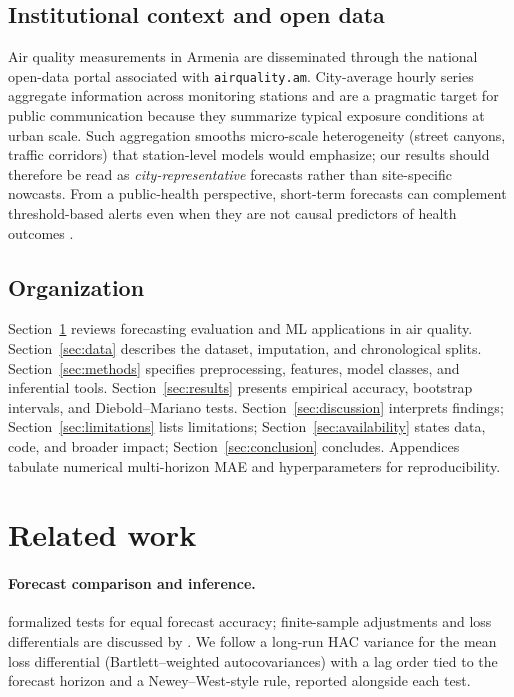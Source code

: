 \documentclass[11pt,a4paper]{article}
\begin{document}
\subsection{Institutional context and open data}

Air quality measurements in Armenia are disseminated through the national open-data portal associated with \texttt{airquality.am}. City-average hourly series aggregate information across monitoring stations and are a pragmatic target for public communication because they summarize typical exposure conditions at urban scale. Such aggregation smooths micro-scale heterogeneity (street canyons, traffic corridors) that station-level models would emphasize; our results should therefore be read as \emph{city-representative} forecasts rather than site-specific nowcasts. From a public-health perspective, short-term forecasts can complement threshold-based alerts even when they are not causal predictors of health outcomes \citep{eea2019air}.

\subsection{Organization}

Section~\ref{sec:related} reviews forecasting evaluation and ML applications in air quality. Section~\ref{sec:data} describes the dataset, imputation, and chronological splits. Section~\ref{sec:methods} specifies preprocessing, features, model classes, and inferential tools. Section~\ref{sec:results} presents empirical accuracy, bootstrap intervals, and Diebold--Mariano tests. Section~\ref{sec:discussion} interprets findings; Section~\ref{sec:limitations} lists limitations; Section~\ref{sec:availability} states data, code, and broader impact; Section~\ref{sec:conclusion} concludes. Appendices tabulate numerical multi-horizon MAE and hyperparameters for reproducibility.

\section{Related work}
\label{sec:related}

\paragraph{Forecast comparison and inference.}
\citet{diebold1995comparing} formalized tests for equal forecast accuracy; finite-sample adjustments and loss differentials are discussed by \citet{harvey1997testing}. We follow a long-run HAC variance for the mean loss differential (Bartlett--weighted autocovariances) with a lag order tied to the forecast horizon and a Newey--West-style rule, reported alongside each test.
\end{document}

